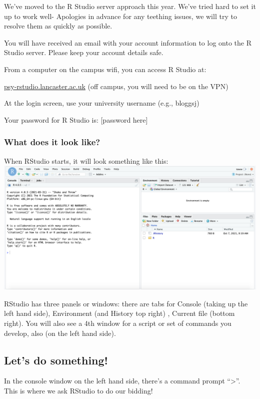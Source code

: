\documentclass[
]{book}
\begin{document}
We've moved to the R Studio server approach this year. We've tried hard to set it up to work well- Apologies in advance for any teething issues, we will try to resolve them as quickly as possible.

You will have received an email with your account information to log onto the R Studio server. Please keep your account details safe.

From a computer on the campus wifi, you can access R Studio at:

\href{http://psy-rstudio.lancaster.ac.uk}{psy-rstudio.lancaster.ac.uk} (off campus, you will need to be on the VPN)

At the login screen, use your university username (e.g., bloggsj)

Your password for R Studio is: {[}password here{]}

\hypertarget{what-does-it-look-like}{%
\subsubsection{What does it look like?}\label{what-does-it-look-like}}

When RStudio starts, it will look something like this: \includegraphics{files/Week_1/server_startup.png}

RStudio has three panels or windows: there are tabs for Console (taking up the left hand side), Environment (and History top right) , Current file (bottom right). You will also see a 4th window for a script or set of commands you develop, also (on the left hand side).

\hypertarget{lets-do-something}{%
\subsection{Let's do something!}\label{lets-do-something}}

In the console window on the left hand side, there's a command prompt ``\textgreater{}''. This is where we ask RStudio to do our bidding!
\end{document}
